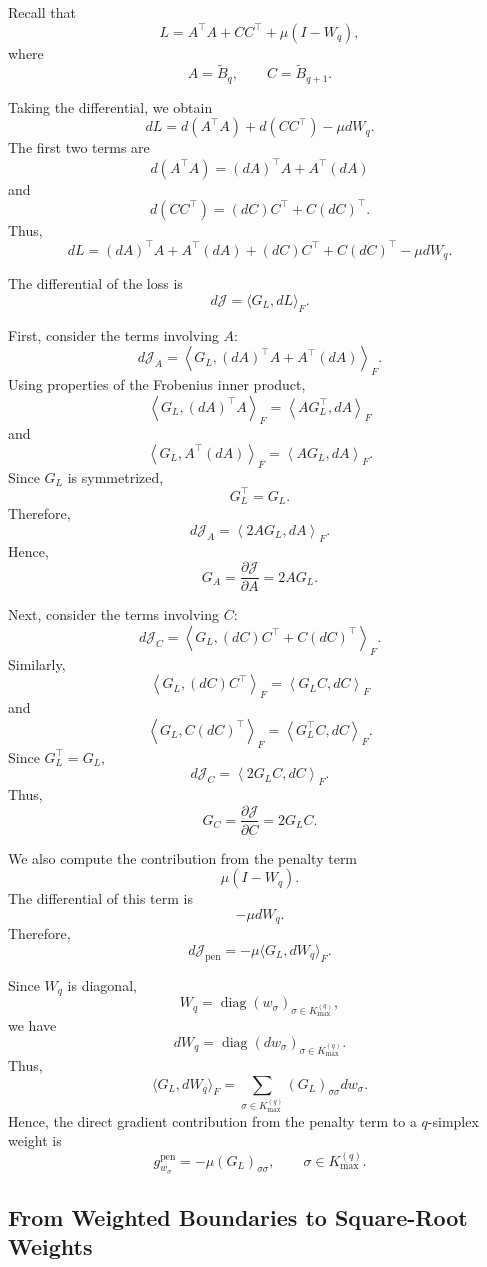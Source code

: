 \documentclass[pdflatex,sn-mathphys-ay]{sn-jnl}%
\theoremstyle{thmstyleone}%
\theoremstyle{thmstyletwo}%
\theoremstyle{thmstylethree}%
\begin{document}
\begin{appendices}
Recall that
\[
L
=
A^\top A
+
CC^\top
+
\mu(I-W_q),
\]
where
\[
A=\widetilde{B}_q,
\qquad
C=\widetilde{B}_{q+1}.
\]

Taking the differential, we obtain
\[
dL
=
d(A^\top A)
+
d(CC^\top)
-
\mu dW_q.
\]
The first two terms are
\[
d(A^\top A)
=
(dA)^\top A
+
A^\top(dA)
\]
and
\[
d(CC^\top)
=
(dC)C^\top
+
C(dC)^\top.
\]
Thus,
\[
dL
=
(dA)^\top A
+
A^\top(dA)
+
(dC)C^\top
+
C(dC)^\top
-
\mu dW_q.
\]

The differential of the loss is
\[
d\mathcal{J}
=
\langle G_L,dL\rangle_F.
\]

First, consider the terms involving \(A\):
\[
d\mathcal{J}_A
=
\left\langle
G_L,
(dA)^\top A
+
A^\top(dA)
\right\rangle_F.
\]
Using properties of the Frobenius inner product,
\[
\left\langle
G_L,
(dA)^\top A
\right\rangle_F
=
\left\langle
AG_L^\top,
dA
\right\rangle_F
\]
and
\[
\left\langle
G_L,
A^\top(dA)
\right\rangle_F
=
\left\langle
AG_L,
dA
\right\rangle_F.
\]
Since \(G_L\) is symmetrized,
\[
G_L^\top=G_L.
\]
Therefore,
\[
d\mathcal{J}_A
=
\left\langle
2AG_L,
dA
\right\rangle_F.
\]
Hence,
\[
G_A
=
\frac{\partial\mathcal{J}}{\partial A}
=
2AG_L.
\]

Next, consider the terms involving \(C\):
\[
d\mathcal{J}_C
=
\left\langle
G_L,
(dC)C^\top
+
C(dC)^\top
\right\rangle_F.
\]
Similarly,
\[
\left\langle
G_L,
(dC)C^\top
\right\rangle_F
=
\left\langle
G_LC,
dC
\right\rangle_F
\]
and
\[
\left\langle
G_L,
C(dC)^\top
\right\rangle_F
=
\left\langle
G_L^\top C,
dC
\right\rangle_F.
\]
Since \(G_L^\top=G_L\),
\[
d\mathcal{J}_C
=
\left\langle
2G_LC,
dC
\right\rangle_F.
\]
Thus,
\[
G_C
=
\frac{\partial\mathcal{J}}{\partial C}
=
2G_LC.
\]

We also compute the contribution from the penalty term
\[
\mu(I-W_q).
\]
The differential of this term is
\[
-\mu dW_q.
\]
Therefore,
\[
d\mathcal{J}_{\mathrm{pen}}
=
-\mu
\langle G_L,dW_q\rangle_F.
\]

Since \(W_q\) is diagonal,
\[
W_q
=
\operatorname{diag}(w_\sigma)_{\sigma\in K_{\max}^{(q)}},
\]
we have
\[
dW_q
=
\operatorname{diag}(dw_\sigma)_{\sigma\in K_{\max}^{(q)}}.
\]
Thus,
\[
\langle G_L,dW_q\rangle_F
=
\sum_{\sigma\in K_{\max}^{(q)}}
(G_L)_{\sigma\sigma}dw_\sigma.
\]
Hence, the direct gradient contribution from the penalty term to a \(q\)-simplex weight is
\[
g_{w_\sigma}^{\mathrm{pen}}
=
-\mu(G_L)_{\sigma\sigma},
\qquad
\sigma\in K_{\max}^{(q)}.
\]

\subsection{From Weighted Boundaries to Square-Root Weights}


\end{appendices}
\end{document}
